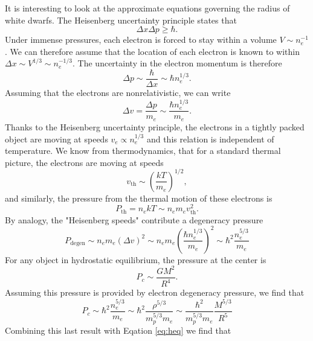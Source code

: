 \documentclass[a4paper,12pt]{article}
\theoremstyle{remark}
\newcommand{\mrm}[1]{\mathrm{#1}}
\renewcommand{\=}[1]{\stackrel{#1}{=}} %
\theoremstyle{plain}
\theoremstyle{definition}
\begin{document}
It is interesting to look at the approximate equations governing the radius of white dwarfs. The Heisenberg uncertainty principle states that 
\begin{equation}
\Delta x \Delta p \geq \hbar.
\end{equation}
Under immense pressures, each electron is forced to stay within a volume $V \sim n_e^{-1}$. We can therefore assume that the location of each electron is known to within~$\Delta x \sim V^{1/3} \sim n_e^{-1/3}$. The uncertainty in the electron momentum is therefore 
\begin{equation}
\Delta p \sim \frac{\hbar}{\Delta x} \sim \hbar n_e^{1/3}.
\end{equation}
Assuming that the electrons are nonrelativistic, we can write 
\begin{equation}
\Delta v = \frac{\Delta p}{m_e} \sim \frac{\hbar n_e^{1/3}}{m_e}.
\end{equation}
Thanks to the Heisenberg uncertainty principle, the electrons in a tightly packed object are moving at speeds $v_e \propto n_e ^{1/3}$ and this relation is independent of temperature. We know from thermodynamics, that for a standard thermal picture, the electrons are moving at speeds
\begin{equation}
v_\mrm{th} \sim \left(\frac{kT}{m_e} \right)^{1/2},
\end{equation}
and similarly, the pressure from the thermal motion of these electrons is 
\begin{equation}
P_\mrm{th} = n_e k T \sim n_e m_e v^2_\mrm{th}.
\end{equation}
By analogy, the "Heisenberg speeds" contribute a degeneracy pressure 
\begin{equation}
P_\mrm{degen} \sim n_e m_e (\Delta v)^2 \sim n_e m_e \left( \frac{\hbar n_e^{1/3}}{m_e} \right)^2 \sim \hbar^2 \frac{n_e ^{5/3}}{m_e}
\end{equation}
For any object in hydrostatic equilibrium, the pressure at the center is 
\begin{equation}
P_c \sim \frac{GM^2}{R^4}.
\label{eq:heq}
\end{equation}
Assuming this pressure is provided by electron degeneracy pressure, we find that 
\begin{equation}
P_c \sim \hbar^2 \frac{n_e ^{5/3}}{m_e} \sim \hbar^2 \frac{\rho ^{5/3}}{m_p^{5/3} m_e}  \sim \frac{\hbar^2}{m_p^{5/3} m_e} \frac{M^{5/3}}{R^5}
\end{equation}
Combining this last result with Eqation \ref{eq:heq} we find that 
\end{document}

